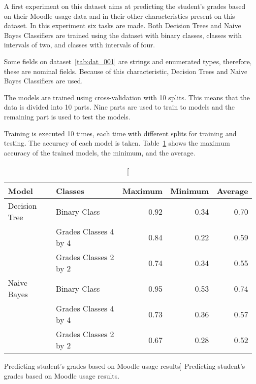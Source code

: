 A first experiment on this dataset aims at predicting the student's grades based
on their Moodle usage data and in their other characteristics present on this
dataset. In this experiment six tasks are made. Both Decision Trees and Naive
Bayes Classifiers are trained using the dataset with binary classes, classes
with intervals of two, and classes with intervals of four.

Some fields on dataset~\ref{tab:dat_001} are strings and enumerated types,
therefore, these are nominal fields. Because of this characteristic, Decision
Trees and Naive Bayes Classifiers are used.

The models are trained using cross-validation with 10 splits. This means that
the data is divided into 10 parts. Nine parts are used to train to models and
the remaining part is used to test the models.

Training is executed 10 times, each time with different splits for training and
testing. The accuracy of each model is taken. Table~\ref{tab:exp_001_res} shows
the maximum accuracy of the trained models, the minimum, and the average.

\begin{table}[h!]
    \centering

    \begin{tabular}{| l | l | r | r | r |}
        \hline
        \textbf{Model} & \textbf{Classes} & \textbf{Maximum} & \textbf{Minimum} & \textbf{Average} \\ \hline
        Decision Tree & Binary Class          & 0.92 & 0.34 & 0.70 \\
                      & Grades Classes 4 by 4 & 0.84 & 0.22 & 0.59 \\
                      & Grades Classes 2 by 2 & 0.74 & 0.34 & 0.55 \\ \hline
        Naive Bayes   & Binary Class          & 0.95 & 0.53 & 0.74 \\
                      & Grades Classes 4 by 4 & 0.73 & 0.36 & 0.57 \\
                      & Grades Classes 2 by 2 & 0.67 & 0.28 & 0.52 \\ \hline
    \end{tabular}

    \caption
        [Predicting student's grades based on Moodle usage results]
        {Predicting student's grades based on Moodle usage results.}

    \label{tab:exp_001_res}
\end{table}

